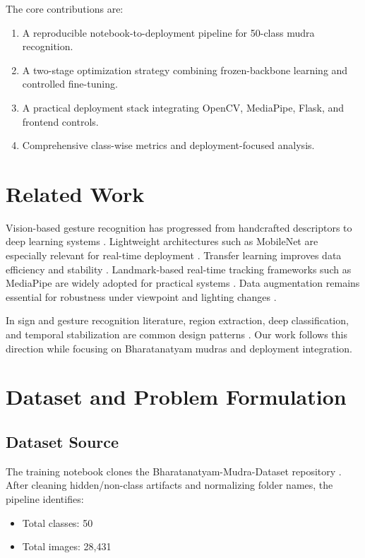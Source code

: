\documentclass[conference]{IEEEtran}
\begin{document}
The core contributions are:
\begin{enumerate}
\item A reproducible notebook-to-deployment pipeline for 50-class mudra recognition.
\item A two-stage optimization strategy combining frozen-backbone learning and controlled fine-tuning.
\item A practical deployment stack integrating OpenCV, MediaPipe, Flask, and frontend controls.
\item Comprehensive class-wise metrics and deployment-focused analysis.
\end{enumerate}

\section{Related Work}
Vision-based gesture recognition has progressed from handcrafted descriptors to deep learning systems \cite{lecun2015deep}. Lightweight architectures such as MobileNet are especially relevant for real-time deployment \cite{sandler2018mobilenetv2,howard2019mobilenetv3}. Transfer learning improves data efficiency and stability \cite{pan2010transfer,weiss2016survey}. Landmark-based real-time tracking frameworks such as MediaPipe are widely adopted for practical systems \cite{bazarevsky2020blazepose}. Data augmentation remains essential for robustness under viewpoint and lighting changes \cite{perez2017augmentation,shorten2019survey}.

In sign and gesture recognition literature, region extraction, deep classification, and temporal stabilization are common design patterns \cite{koller2016deep,simonyan2014twostream}. Our work follows this direction while focusing on Bharatanatyam mudras and deployment integration.

\section{Dataset and Problem Formulation}
\subsection{Dataset Source}
The training notebook clones the Bharatanatyam-Mudra-Dataset repository \cite{mudradataset}. After cleaning hidden/non-class artifacts and normalizing folder names, the pipeline identifies:
\begin{itemize}
\item Total classes: 50
\item Total images: 28,431
\end{itemize}
\end{document}
